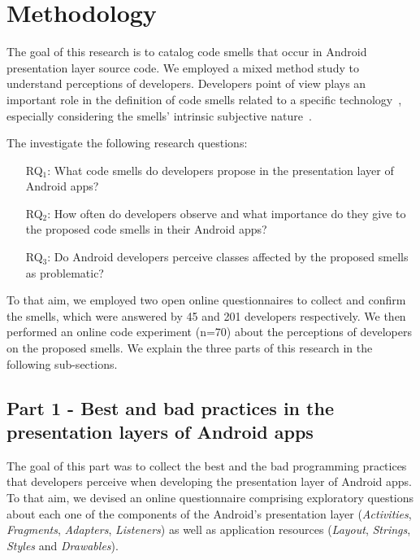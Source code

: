 \section{Methodology}

The goal of this research is to catalog code smells that occur in Android presentation layer source code. We employed a mixed method study to understand perceptions of developers. Developers point of view plays an important role in the definition of code smells related to a specific technology~\cite{arcverde2011understanding, Palomba_Do_2014, yamashita2013developers}, especially considering the smells' intrinsic subjective nature~\cite{JavascriptSmells, JavaQADetectingSmells:02}.

The investigate the following research questions:

\newcommand{\rqone}{What code smells do developers propose in the presentation layer of Android apps?}
\newcommand{\rqtwo}{How often do developers observe and what importance do they give to the proposed code smells in their Android apps?}
\newcommand{\rqthree}{Do Android developers perceive classes affected by the proposed smells as problematic?}

\begin{itemize}
	\item[RQ$_1$:] \rqone

	\item[RQ$_2$:] \rqtwo

	\item[RQ$_3$:] \rqthree
\end{itemize}

To that aim, we employed two open online questionnaires to collect and confirm the smells, which were answered by 45 and 201 developers respectively. We then performed an online code experiment (n=70) about the perceptions of developers on the proposed smells. 
We explain the three parts of this research in the following sub-sections.

\subsection{Part 1 - Best and bad practices in the presentation layers of Android apps}
\label{etapa-1}

The goal of this part was to collect the best and the bad programming practices 
that developers perceive when developing the presentation layer of Android apps.
To that aim, we devised an online questionnaire comprising exploratory questions
about each one of the components of the Android's presentation layer 
(\textit{Activities}, \textit{Fragments}, \textit{Adapters}, \textit{Listeners}) 
as well as application resources (\textit{Layout}, \textit{Strings}, 
\textit{Styles} and \textit{Drawables}). 

